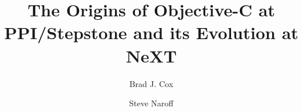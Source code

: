 \documentclass[acmsmall]{acmart}\settopmatter{}
\begin{document}
\title[The Origins of Objective-C]{The Origins of Objective-C at PPI/Stepstone and its Evolution at NeXT}         %



\author{Brad J. Cox}

\author{Steve Naroff}
\end{document}
